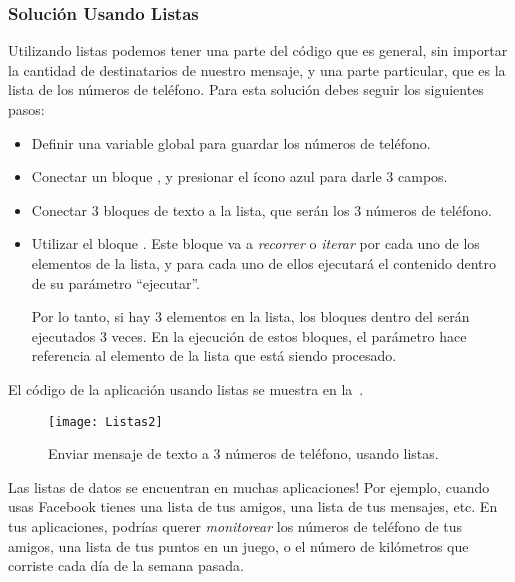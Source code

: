 {{\subsubsection*{Solución Usando Listas}

Utilizando listas podemos tener una parte del código que es general,
sin importar la cantidad de destinatarios de nuestro mensaje, y una
parte particular, que es la lista de los números de teléfono. Para
esta solución debes seguir los siguientes pasos:

\begin{itemize}

\item Definir una variable global para guardar los números de
  teléfono.

\item Conectar un bloque , y presionar el
    ícono azul para darle 3 campos.

  \item Conectar 3 bloques de texto a la lista, que serán los 3
    números de teléfono.

  \item Utilizar el bloque . Este
    bloque va a \emph{recorrer} o \emph{iterar} por cada uno de los
    elementos de la lista, y para cada uno de ellos ejecutará el
    contenido dentro de su parámetro ``ejecutar''.

    Por lo tanto, si hay 3 elementos en la lista, los bloques dentro
    del  serán ejecutados 3 veces. En la ejecución
    de estos bloques, el parámetro  hace
    referencia al elemento de la lista que está siendo procesado.
\end{itemize}

El código de la aplicación usando listas se muestra en
la~.

\begin{figure}[H]
\centering
\texttt{[image: Listas2]}
\caption{Enviar mensaje de texto a 3 números de teléfono, usando listas.}
\label{fig:Listas2}
\end{figure}

Las listas de datos se encuentran en muchas aplicaciones! Por ejemplo,
cuando usas Facebook tienes una lista de tus amigos, una lista de tus
mensajes, etc. En tus aplicaciones, podrías querer \emph{monitorear}
los números de teléfono de tus amigos, una lista de tus puntos en un
juego, o el número de kilómetros que corriste cada día de la semana
pasada.

}}
